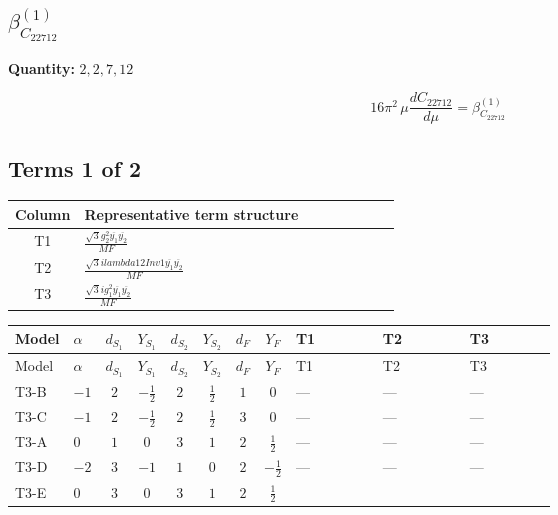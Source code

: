 \documentclass[8pt]{article}
\begin{document}
\begin{landscape}
\section*{$\beta_{C_{22712}}^{(1)}$}
\noindent\textbf{Quantity: }$\mathrm{2,2,7,12}$\par\smallskip
\[16\pi^2\,\mu\frac{d C_{22712}}{d\mu}=\beta_{C_{22712}}^{(1)}\]
\subsection*{Terms 1 of 2}
\begin{center}
\begin{tabular}{@{}c >{\raggedright\arraybackslash}p{0.82\linewidth}@{}}
\toprule
Column & Representative term structure \\
\midrule
T1 & \(\displaystyle \frac{\sqrt{3} g_{2}^{2} \overline{y_{1}} \overline{y_{2}}}{MF}\) \\
\midrule
T2 & \(\displaystyle \frac{\sqrt{3} i lambda12Inv1 \overline{y_{1}} \overline{y_{2}}}{MF}\) \\
\midrule
T3 & \(\displaystyle \frac{\sqrt{3} i g_{1}^{2} \overline{y_{1}} \overline{y_{2}}}{MF}\) \\
\midrule
\bottomrule
\end{tabular}
\end{center}
\smallskip
\tiny
\begin{longtable}{@{}llcccccc >{\raggedright\arraybackslash}p{0.21\linewidth} >{\raggedright\arraybackslash}p{0.21\linewidth} >{\raggedright\arraybackslash}p{0.21\linewidth}@{}}
\toprule
Model & $\alpha$ & $d_{S_1}$ & $Y_{S_1}$ & $d_{S_2}$ & $Y_{S_2}$ & $d_F$ & $Y_F$ & T1 & T2 & T3 \\
\midrule
\endfirsthead
\toprule
Model & $\alpha$ & $d_{S_1}$ & $Y_{S_1}$ & $d_{S_2}$ & $Y_{S_2}$ & $d_F$ & $Y_F$ & T1 & T2 & T3 \\
\midrule
\endhead
T3-B & $-1$ & $2$ & $-\frac{1}{2}$ & $2$ & $\frac{1}{2}$ & $1$ & $0$ & --- & --- & --- \\
\midrule
T3-C & $-1$ & $2$ & $-\frac{1}{2}$ & $2$ & $\frac{1}{2}$ & $3$ & $0$ & --- & --- & --- \\
\midrule
T3-A & $0$ & $1$ & $0$ & $3$ & $1$ & $2$ & $\frac{1}{2}$ & --- & --- & --- \\
\midrule
T3-D & $-2$ & $3$ & $-1$ & $1$ & $0$ & $2$ & $-\frac{1}{2}$ & --- & --- & --- \\
\midrule
T3-E & $0$ & $3$ & $0$ & $3$ & $1$ & $2$ & $\frac{1}{2}$ & \scriptsize\adjustbox{max width=\linewidth}{$\begin{gathered} \frac{\sqrt{3} g_{2}^{2} \overline{y_{1}} \overline{y_{2}}}{6 MF}\end{gathered}$} & \scriptsize\adjustbox{max width=\linewidth}{$\begin{gathered} - \frac{\sqrt{3} i lambda12Inv1 \overline{y_{1}} \overline{y_{2}}}{6 MF}\end{gathered}$} & \scriptsize\adjustbox{max width=\linewidth}{$\begin{gathered} \frac{\sqrt{3} i g_{1}^{2} \overline{y_{1}} \overline{y_{2}}}{8 MF}\end{gathered}$} \\

\end{longtable}
\end{landscape}
\end{document}
